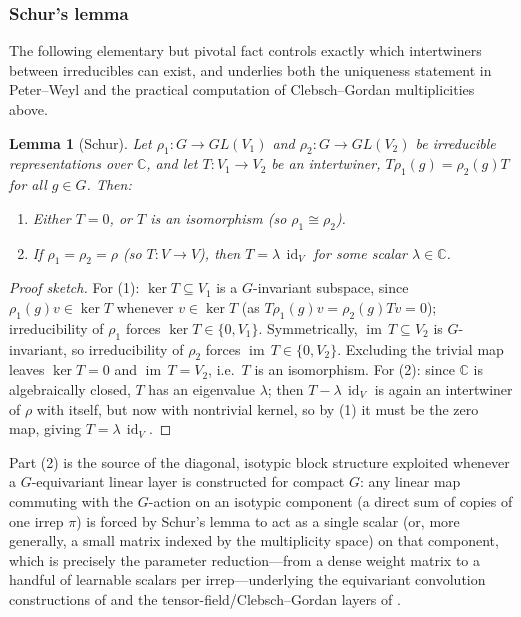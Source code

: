 \documentclass[11pt]{article}
\theoremstyle{plain}
\newtheorem{Lemma}{Lemma}[section]
\theoremstyle{definition}
\begin{document}
\subsubsection{Schur's lemma}
\label{subsubsec:schurs-lemma}

The following elementary but pivotal fact controls exactly which
intertwiners between irreducibles can exist, and underlies both the
uniqueness statement in Peter--Weyl and the practical computation of
Clebsch--Gordan multiplicities above.

\begin{Lemma}[Schur]
\label{lem:schur}
Let $\rho_1 : G \to GL(V_1)$ and $\rho_2 : G \to GL(V_2)$ be irreducible
representations over $\mathbb{C}$, and let $T : V_1 \to V_2$ be an
intertwiner, $T\rho_1(g) = \rho_2(g) T$ for all $g \in G$. Then:
\begin{enumerate}
    \item Either $T = 0$, or $T$ is an isomorphism (so $\rho_1 \cong \rho_2$).
    \item If $\rho_1 = \rho_2 = \rho$ (so $T : V \to V$), then
    $T = \lambda\, \operatorname{id}_V$ for some scalar $\lambda \in \mathbb{C}$.
\end{enumerate}
\end{Lemma}

\begin{proof}[Proof sketch]
For (1): $\ker T \subseteq V_1$ is a $G$-invariant subspace, since
$\rho_1(g)v \in \ker T$ whenever $v \in \ker T$ (as $T\rho_1(g)v =
\rho_2(g)Tv = 0$); irreducibility of $\rho_1$ forces $\ker T \in \{0, V_1\}$.
Symmetrically, $\operatorname{im}\, T \subseteq V_2$ is $G$-invariant, so
irreducibility of $\rho_2$ forces $\operatorname{im}\, T \in \{0, V_2\}$. Excluding
the trivial map leaves $\ker T = 0$ and $\operatorname{im}\, T = V_2$, i.e.\ $T$ is
an isomorphism. For (2): since $\mathbb{C}$ is algebraically closed, $T$ has
an eigenvalue $\lambda$; then $T - \lambda\,\operatorname{id}_V$ is again an
intertwiner of $\rho$ with itself, but now with nontrivial kernel, so by (1)
it must be the zero map, giving $T = \lambda\,\operatorname{id}_V$.
\end{proof}

Part (2) is the source of the diagonal, isotypic block structure exploited
whenever a $G$-equivariant linear layer is constructed for compact $G$: any
linear map commuting with the $G$-action on an isotypic component (a direct
sum of copies of one irrep $\pi$) is forced by Schur's lemma to act as a
single scalar (or, more generally, a small matrix indexed by the
multiplicity space) on that component, which is precisely the parameter
reduction---from a dense weight matrix to a handful of learnable
scalars per irrep---underlying the equivariant convolution constructions of
\citep{cohen2014} and the tensor-field/Clebsch--Gordan layers of
\citep{kondor2018p3icml}.
\end{document}
